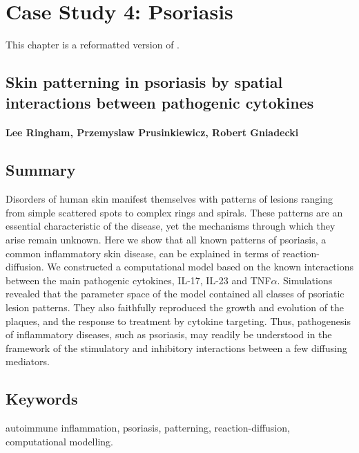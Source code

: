 \chapter{Case Study 4: Psoriasis}

This chapter is a reformatted version of \citep{ringham2019}.

\section*{Skin patterning in psoriasis by spatial interactions between pathogenic cytokines}
\subsubsection*{Lee Ringham, Przemyslaw Prusinkiewicz, Robert Gniadecki}

\section{Summary} 
Disorders of human skin manifest themselves with patterns of lesions ranging from simple scattered spots to complex rings and spirals. These patterns are an essential characteristic of the disease, yet the mechanisms through which they arise remain unknown. Here we show that all known patterns of psoriasis, a common inflammatory skin disease, can be explained in terms of reaction-diffusion. We constructed a computational model based on the known interactions between the main pathogenic cytokines, IL-17, IL-23 and TNF$\alpha$. Simulations revealed that the parameter space of the model contained all classes of psoriatic lesion patterns. They also faithfully reproduced the growth and evolution of the plaques, and the response to treatment by cytokine targeting. Thus, pathogenesis of inflammatory diseases, such as psoriasis, may readily be understood in the framework of the stimulatory and inhibitory interactions between a few diffusing mediators.

\section{Keywords}
autoimmune inflammation, psoriasis, patterning, reaction-diffusion, computational modelling.

